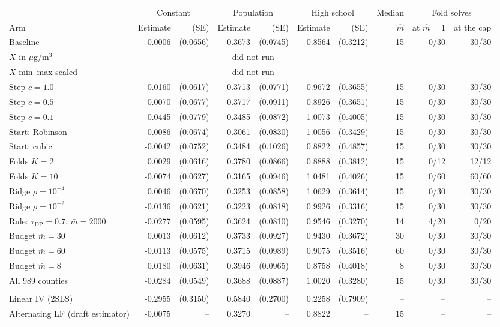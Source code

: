 \begin{tabular}{lrrrrrrrrr}
\toprule
& \multicolumn{2}{c}{Constant} & \multicolumn{2}{c}{Population} & \multicolumn{2}{c}{High school} & Median & \multicolumn{2}{c}{Fold solves} \\
\cmidrule(lr){2-3} \cmidrule(lr){4-5} \cmidrule(lr){6-7} \cmidrule(lr){9-10}
Arm & Estimate & (SE) & Estimate & (SE) & Estimate & (SE) & $\hat m$ & at $\hat m = 1$ & at the cap \\
\midrule
Baseline & -0.0006 & (0.0656) & 0.3673 & (0.0745) & 0.8564 & (0.3212) & 15 & 0/30 & 30/30 \\
$X$ in $\mu$g/m$^3$ & \multicolumn{6}{c}{did not run} & -- & -- & -- \\
$X$ min--max scaled & \multicolumn{6}{c}{did not run} & -- & -- & -- \\
Step $c = 1.0$ & -0.0160 & (0.0617) & 0.3713 & (0.0771) & 0.9672 & (0.3655) & 15 & 0/30 & 30/30 \\
Step $c = 0.5$ & 0.0070 & (0.0677) & 0.3717 & (0.0911) & 0.8926 & (0.3651) & 15 & 0/30 & 30/30 \\
Step $c = 0.1$ & 0.0445 & (0.0779) & 0.3485 & (0.0872) & 1.0073 & (0.4005) & 15 & 0/30 & 30/30 \\
Start: Robinson & 0.0086 & (0.0674) & 0.3061 & (0.0830) & 1.0056 & (0.3429) & 15 & 0/30 & 30/30 \\
Start: cubic & -0.0042 & (0.0752) & 0.3484 & (0.1026) & 0.8822 & (0.4857) & 15 & 0/30 & 30/30 \\
Folds $K = 2$ & 0.0029 & (0.0616) & 0.3780 & (0.0866) & 0.8888 & (0.3812) & 15 & 0/12 & 12/12 \\
Folds $K = 10$ & -0.0074 & (0.0627) & 0.3165 & (0.0946) & 1.0481 & (0.4026) & 15 & 0/60 & 60/60 \\
Ridge $\rho = 10^{-4}$ & 0.0046 & (0.0670) & 0.3253 & (0.0858) & 1.0629 & (0.3614) & 15 & 0/30 & 30/30 \\
Ridge $\rho = 10^{-2}$ & -0.0136 & (0.0621) & 0.3223 & (0.0818) & 0.9926 & (0.3316) & 15 & 0/30 & 30/30 \\
Rule: $\tau_{\mathrm{DP}} = 0.7$, $\bar m = 2000$ & -0.0277 & (0.0595) & 0.3624 & (0.0810) & 0.9546 & (0.3270) & 14 & 4/20 & 0/20 \\
Budget $\bar m = 30$ & 0.0013 & (0.0612) & 0.3733 & (0.0927) & 0.9430 & (0.3672) & 30 & 0/30 & 30/30 \\
Budget $\bar m = 60$ & -0.0113 & (0.0575) & 0.3715 & (0.0989) & 0.9075 & (0.3516) & 60 & 0/30 & 30/30 \\
Budget $\bar m = 8$ & 0.0180 & (0.0631) & 0.3946 & (0.0965) & 0.8758 & (0.4018) & 8 & 0/30 & 30/30 \\
All 989 counties & -0.0284 & (0.0549) & 0.3688 & (0.0887) & 1.0020 & (0.3280) & 15 & 0/30 & 30/30 \\
\addlinespace
\multicolumn{10}{l}{\textit{Comparison estimators}} \\
Linear IV (2SLS) & -0.2955 & (0.3150) & 0.5840 & (0.2700) & 0.2258 & (0.7909) & -- & -- & -- \\
Alternating LF (draft estimator) & -0.0075 & -- & 0.3270 & -- & 0.8822 & -- & 15 & -- & -- \\
\bottomrule
\end{tabular}
